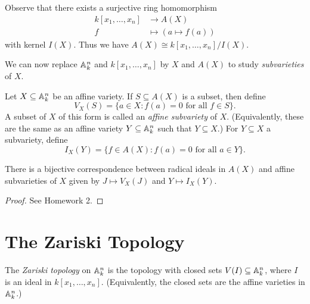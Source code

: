\begin{remark}
  Observe that there exists a surjective
  ring homomorphism
  \begin{align*}
    k[x_1, \dots, x_n] &\longrightarrow A(X) \\
    f &\longmapsto (a \mapsto f(a))
  \end{align*}
  with kernel $I(X)$. Thus we have
  $A(X) \cong k[x_1, \dots, x_n] / I(X)$.
\end{remark}

\begin{remark}
  We can now replace $\mathbb{A}_k^n$ and
  $k[x_1, \dots, x_n]$
  by $X$ and $A(X)$ to study
  \emph{subvarieties} of $X$.
\end{remark}

\begin{definition}
  Let $X \subseteq \mathbb{A}_k^n$
  be an affine variety.
  If $S \subseteq A(X)$
  is a subset, then define
  \[
    V_X(S) = \{a \in X : f(a) = 0 \text{ for all } f \in S\}.
  \]
  A subset of $X$ of this form is called
  an \emph{affine subvariety} of $X$.
  (Equivalently, these are the same as
  an affine variety $Y \subseteq \mathbb{A}_k^n$
  such that $Y \subseteq X$.) For $Y \subseteq X$ a
  subvariety, define
  \[
    I_X(Y) = \{f \in A(X) : f(a) = 0 \text{ for all } a \in Y\}.
  \]
\end{definition}

\begin{prop}
  There is a bijective correspondence
  between radical ideals in $A(X)$ and
  affine subvarieties of $X$
  given by $J \mapsto V_X(J)$ and
  $Y \mapsto I_X(Y)$.
\end{prop}

\begin{proof}
  See Homework 2.
\end{proof}

\section{The Zariski Topology}

\begin{definition}
  The \emph{Zariski topology} on
  $\mathbb{A}_k^n$ is the topology with
  closed sets $V(I) \subseteq \mathbb{A}_k^n$,
  where $I$ is an ideal in
  $k[x_1, \dots, x_n]$. (Equivalently,
  the closed sets are the affine varieties
  in $\mathbb{A}_k^n$.)
\end{definition}

